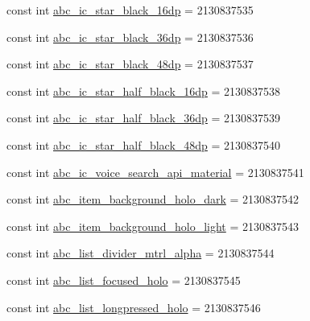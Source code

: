 \begin{DoxyCompactItemize}
const int \mbox{\hyperlink{class_f_w_p_s___app_1_1_droid_1_1_resource_1_1_drawable_a073c72587a0a7f762225ccb48a8cb8b1}{abc\+\_\+ic\+\_\+star\+\_\+black\+\_\+16dp}} = 2130837535
\item 
const int \mbox{\hyperlink{class_f_w_p_s___app_1_1_droid_1_1_resource_1_1_drawable_aab796ecc8d0539e2d3166e9c58ef5bae}{abc\+\_\+ic\+\_\+star\+\_\+black\+\_\+36dp}} = 2130837536
\item 
const int \mbox{\hyperlink{class_f_w_p_s___app_1_1_droid_1_1_resource_1_1_drawable_ad9e52c44cd0e5577e72e2714401ad300}{abc\+\_\+ic\+\_\+star\+\_\+black\+\_\+48dp}} = 2130837537
\item 
const int \mbox{\hyperlink{class_f_w_p_s___app_1_1_droid_1_1_resource_1_1_drawable_a4c523775e116f92dbdcee2e5e0ea6734}{abc\+\_\+ic\+\_\+star\+\_\+half\+\_\+black\+\_\+16dp}} = 2130837538
\item 
const int \mbox{\hyperlink{class_f_w_p_s___app_1_1_droid_1_1_resource_1_1_drawable_a01bb5d1d83bf59f51cece3cadbab2d21}{abc\+\_\+ic\+\_\+star\+\_\+half\+\_\+black\+\_\+36dp}} = 2130837539
\item 
const int \mbox{\hyperlink{class_f_w_p_s___app_1_1_droid_1_1_resource_1_1_drawable_a0c18c8b607479d37ed33fededd8c5d59}{abc\+\_\+ic\+\_\+star\+\_\+half\+\_\+black\+\_\+48dp}} = 2130837540
\item 
const int \mbox{\hyperlink{class_f_w_p_s___app_1_1_droid_1_1_resource_1_1_drawable_ac811534552283fddd49187c3b27134bc}{abc\+\_\+ic\+\_\+voice\+\_\+search\+\_\+api\+\_\+material}} = 2130837541
\item 
const int \mbox{\hyperlink{class_f_w_p_s___app_1_1_droid_1_1_resource_1_1_drawable_a7c9877611e5c09bd33be3447a2bb9dc6}{abc\+\_\+item\+\_\+background\+\_\+holo\+\_\+dark}} = 2130837542
\item 
const int \mbox{\hyperlink{class_f_w_p_s___app_1_1_droid_1_1_resource_1_1_drawable_a0f1db2df66b74917ef2ad18d9d98b037}{abc\+\_\+item\+\_\+background\+\_\+holo\+\_\+light}} = 2130837543
\item 
const int \mbox{\hyperlink{class_f_w_p_s___app_1_1_droid_1_1_resource_1_1_drawable_a266638aa8952e3586b8bf0aa739c399f}{abc\+\_\+list\+\_\+divider\+\_\+mtrl\+\_\+alpha}} = 2130837544
\item 
const int \mbox{\hyperlink{class_f_w_p_s___app_1_1_droid_1_1_resource_1_1_drawable_a235d106c9b95bd206bceddd715ee8565}{abc\+\_\+list\+\_\+focused\+\_\+holo}} = 2130837545
\item 
const int \mbox{\hyperlink{class_f_w_p_s___app_1_1_droid_1_1_resource_1_1_drawable_adbeb58653fac6a797166d33020b3debe}{abc\+\_\+list\+\_\+longpressed\+\_\+holo}} = 2130837546

\end{DoxyCompactItemize}

